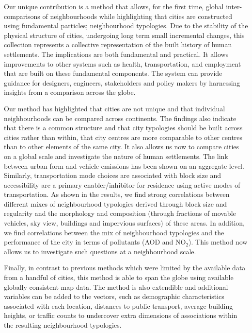 \documentclass[9pt,twocolumn,twoside,lineno]{pnas-new}
\begin{document}
Our unique contribution is a method that allows, for the first time, global inter-comparisons of neighbourhoods while highlighting that cities are constructed using fundamental particles; neighbourhood typologies. Due to the stability of the physical structure of cities, undergoing long term small incremental changes\cite{Wegener1986}, this collection represents a collective representation of the built history of human settlements. The implications are both fundamental and practical. It allows improvements to other systems such as health, transportation, and employment that are built on these fundamental components. The system can provide guidance for designers, engineers, stakeholders and policy makers by harnessing insights from a comparison across the globe. 

Our method has highlighted that cities are not unique and that individual neighbourhoods can be compared across continents. The findings also indicate that there is a common structure and that city typologies should be built across cities rather than within, that city centres are more comparable to other centres than to other elements of the same city. It also allows us now to compare cities on a global scale and investigate the nature of human settlements. The link between urban form and vehicle emissions has been shown on an aggregate level\cite{Frank2000}. Similarly, transportation mode choices are associated with block size and accessibility are a primary enabler/inhibitor for residence using active modes of transportation\cite{Ewing2001,Ewing2009a}. As shown in the results, we find strong correlations between different mixes of neighbourhood typologies derived through block size and regularity and the morphology and composition (through fractions of movable vehicles, sky view, buildings and impervious surfaces) of these areas. In addition, we find correlations between the mix of neighbourhood typologies and the performance of the city in terms of pollutants (AOD and NO$_{2}$). This method now allows us to investigate such questions at a neighbourhood scale. 

Finally, in contrast to previous methods which were limited by the available data from a handful of cities, this method is able to span the globe using available globally consistent map data. The method is also extendible and additional variables can be added to the vectors, such as demographic characteristics associated with each location\cite{Kropp1998}, distances to public transport, average building heights, or traffic counts to undercover extra dimensions of associations within the resulting neighbourhood typologies.
\end{document}
